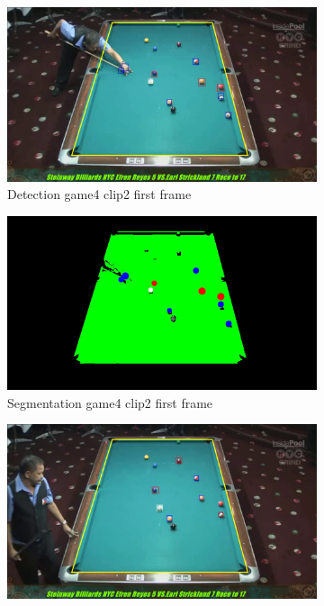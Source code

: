 \begin{figure}[H]
    \centering
    \begin{subfigure}[b]{0.35\textwidth}
        \centering
        \includegraphics[width=\textwidth]{images/Detection/game4_clip2_detected_balls_first_frame.jpg}
        \caption{Detection game4 clip2 first frame}
        \label{fig: game4_clip2_first_frame_detected}
    \end{subfigure}
    \begin{subfigure}[b]{0.35\textwidth}
        \centering
        \includegraphics[width=\textwidth]{images/Segmentation/game4_clip2_segmented_balls_first_frame.jpg}
        \caption{Segmentation game4 clip2 first frame}
		\label{fig: game4_clip2_first_frame_segmented}
    \end{subfigure}
    \begin{subfigure}[b]{0.35\textwidth}
        \centering
        \includegraphics[width=\textwidth]{images/Detection/game4_clip2_detected_balls_last_frame.jpg}

\end{subfigure}
\end{figure}
